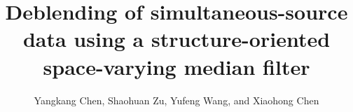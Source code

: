 

  
\title{Deblending of simultaneous-source data using a structure-oriented space-varying median filter}
\renewcommand{\thefootnote}{\fnsymbol{footnote}}

\author{Yangkang Chen\footnotemark[1], Shaohuan Zu\footnotemark[2]\footnotemark[3], Yufeng Wang\footnotemark[3], and Xiaohong Chen\footnotemark[3]}
\address{
\footnotemark[1]
School of Earth Sciences\\
Zhejiang University\\
Hangzhou, Zhejiang Province, China, 310027\\
chenyk2016@gmail.com\\
\footnotemark[2] Modeling and Imaging Laboratory\\
Earth and Planetary Sciences\\
University of California\\
Santa Cruz, CA 95064\\
zushaohuan@qq.com\\
\footnotemark[3]State Key Laboratory of Petroleum Resources and Prospecting \\
China University of Petroleum \\
Fuxue Road 18th\\
Beijing, China, 102200 \\
hellowangyf@163.com \& chenxh@cup.edu.cn \\
}


\DeclareRobustCommand{\dlo}[1]{}
\DeclareRobustCommand{\wen}[1]{#1}


